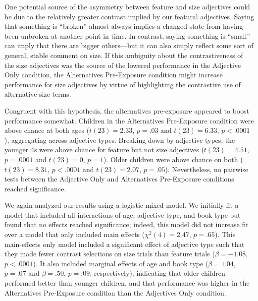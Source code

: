 \documentclass[man]{apa2}
\begin{document}
One potential source of the asymmetry between feature and size adjectives could be due to the relatively greater contrast implied by our featural adjectives. Saying that something is ``broken'' almost always implies a changed state from having been unbroken at another point in time. In contrast, saying something is ``small'' can imply that there are bigger others---but it can also simply reflect some sort of general, stable comment on size. If this ambiguity about the contrastiveness of the size adjectives was the source of the lowered performance in the Adjective Only condition, the Alternatives Pre-Exposure condition might increase performance for size adjectives by virtue of highlighting the contrastive use of alternative size terms. 

Congruent with this hypothesis, the alternatives pre-exposure appeared to boost performance somewhat. Children in the Alternatives Pre-Exposure condition were above chance at both ages ($t(23) = 2.33$, $p = .03$ and $t(23) = 6.33$, $p < .0001$), aggregating across adjective types. Breaking down by adjective types, the younger 4s were above chance for feature but not size adjectives ($t(23) = 4.51$, $p = .0001$ and $t(23)=0$, $p = 1$). Older children were above chance on both ($t(23) = 8.31$, $p < .0001$ and $t(23)= 2.07$, $p = .05$). Nevertheless, no pairwise tests between the Adjective Only and Alternatives Pre-Exposure conditions reached significance. 

We again analyzed our results using a logistic mixed model. We initially fit a model that included all interactions of age, adjective type, and book type but found that no effects reached significance; indeed, this model did not increase fit over a model that only included main effects ($\chi^2(4) = 2.47$, $p = .65$). This main-effects only model included a significant effect of adjective type such that they made fewer contrast selections on size trials than feature trials ($\beta = -1.08$, $p < .0001$). It also included marginal effects of age and book type ($\beta = 1.04$, $p = .07$ and $\beta = .50$, $p = .09$, respectively), indicating that older children performed better than younger children, and that performance was higher in the Alternatives Pre-Exposure condition than the Adjectives Only condition. 


\end{document}
